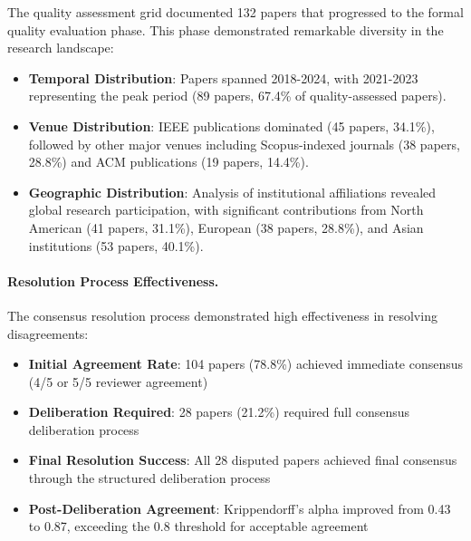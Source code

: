 \documentclass[acmsmall]{acmart}
\begin{document}
The quality assessment grid documented 132 papers that progressed to the formal quality evaluation phase. This phase demonstrated remarkable diversity in the research landscape:

\begin{itemize}
    \item \textbf{Temporal Distribution}: Papers spanned 2018-2024, with 2021-2023 representing the peak period (89 papers, 67.4\% of quality-assessed papers).
    
    \item \textbf{Venue Distribution}: IEEE publications dominated (45 papers, 34.1\%), followed by other major venues including Scopus-indexed journals (38 papers, 28.8\%) and ACM publications (19 papers, 14.4\%).
    
    \item \textbf{Geographic Distribution}: Analysis of institutional affiliations revealed global research participation, with significant contributions from North American (41 papers, 31.1\%), European (38 papers, 28.8\%), and Asian institutions (53 papers, 40.1\%).
\end{itemize}

\paragraph{Resolution Process Effectiveness.}

The consensus resolution process demonstrated high effectiveness in resolving disagreements:

\begin{itemize}
    \item \textbf{Initial Agreement Rate}: 104 papers (78.8\%) achieved immediate consensus (4/5 or 5/5 reviewer agreement)
    \item \textbf{Deliberation Required}: 28 papers (21.2\%) required full consensus deliberation process
    \item \textbf{Final Resolution Success}: All 28 disputed papers achieved final consensus through the structured deliberation process
    \item \textbf{Post-Deliberation Agreement}: Krippendorff's alpha improved from 0.43 to 0.87, exceeding the 0.8 threshold for acceptable agreement
\end{itemize}


\end{document}
